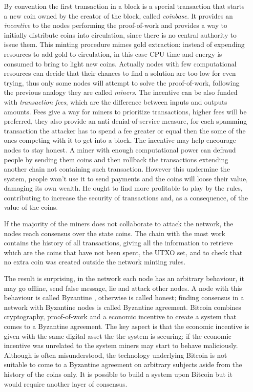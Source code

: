 By convention the first transaction in a block is a special transaction that starts a new coin owned by the creator of the block, called \textit{coinbase}.
It provides an \textit{incentive} to the nodes performing the proof-of-work and provides a way to initially distribute coins into circulation, since there is no central authority to issue them.
This minting procedure mimes gold extraction: instead of expending resources to add gold to circulation, in this case CPU time and energy is consumed to bring to light new coins. 
Actually nodes with few computational resources can decide that their chances to find a solution are too low for even trying, thus only some nodes will attempt to solve the proof-of-work, following the previous analogy they are called \textit{miners}.
The incentive can be also funded with \textit{transaction fees}, which are the difference between inputs and outputs amounts. Fees give a way for miners to prioritize transactions, higher fees will be preferred, they also provide an anti denial-of-service measure, for each spamming transaction the attacker has to spend a fee greater or equal then the some of the ones competing with it to get into a block.
The incentive may help encourage nodes to stay honest. 
A miner with enough computational power can defraud people by sending them coins and then rollback the transactions extending another chain not containing such transaction. 
However this undermine the system, people won't use it to send payments and the coins will loose their value, damaging its own wealth.
He ought to find more profitable to play by the rules, contributing to increase the security of transactions and, as a consequence, of the value of the coins.

If the majority of the miners does not collaborate to attack the network, the nodes reach consensus over the state coins. The chain with the most work contains the history of all transactions, giving all the information to retrieve which are the coins that have not been spent, the UTXO set, and to check that no extra coin was created outside the network minting rules.
 
The result is surprising, in the network each node has an arbitrary behaviour, it may go offline, send false message, lie and attack other nodes. A node with this behaviour is called Byzantine \cite{Wattenhofer:2016:SB:3002702}, otherwise is called honest; 
finding consensus in a network with Byzantine nodes is called Byzantine agreement.
Bitcoin combines cryptography, proof-of-work and a economic incentive to create a system that comes to a Byzantine agreement. 
The key aspect is that the economic incentive is given with the same digital asset the the system is securing; if the economic incentive was unrelated to the system miners may start to behave maliciously.
Although is often misunderstood, the technology underlying Bitcoin is not suitable to come to a Byzantine agreement on arbitrary subjects aside from the history of the coins only. It is possible to build a system upon Bitcoin but it would require another layer of consensus.

